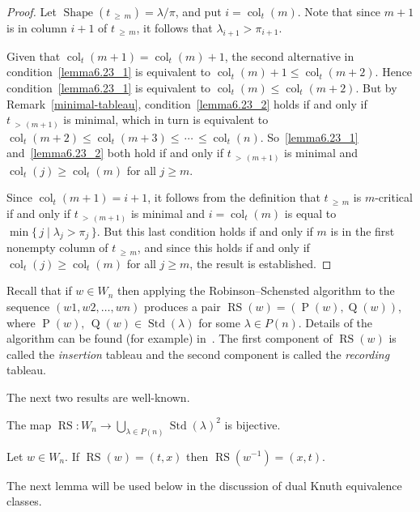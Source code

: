 \documentclass[ALCO,ThmDefs,Unicode,epreuves]{cedram}
\DeclareMathOperator{\col}{col}
\newcommand{\morethan}[2]{#1\,{_{>\,#2}}}
\newcommand{\Morethan}[2]{#1\,{_{\geqslant\,#2}}}
\DeclareMathOperator{\STD}{Std}
\DeclareMathOperator{\shape}{Shape}
\DeclareMathOperator{\RS}{RS}
\DeclareMathOperator{\RSP}{P}
\DeclareMathOperator{\RSQ}{Q}
\begin{document}
\begin{proof}
Let $\shape(\Morethan tm)=\lambda/\pi$, and put $i=\col_t(m)$. Note
that since $m+1$ is in column $i+1$ of $\Morethan tm$, it
follows that $\lambda_{i+1}>\pi_{i+1}$.

Given that $\col_t(m+1)=\col_t(m)+1$, the second alternative in condition~\ref{lemma6.23_1} is
equivalent to $\col_t(m)+1\leqslant\col_t(m+2)$. Hence condition~\ref{lemma6.23_1} is
equivalent to $\col_t(m)\leqslant\col_t(m+2)$. But by Remark~\ref{minimal-tableau},
condition~\ref{lemma6.23_2} holds if and only if $\morethan{t}{(m+1)}$ is minimal, which
in turn is equivalent to
$\col_t(m+2)\leqslant\col_t(m+3)\leqslant \, \cdots \, \leqslant \col_t(n)$.
So~\ref{lemma6.23_1} and~\ref{lemma6.23_2} both hold if and only if $\morethan{t}{(m+1)}$ is minimal
and $\col_t(j)\geqslant \col_t(m)$ for all $j\geqslant m$.

Since $\col_t(m+1)=i+1$, it follows from the definition that
$\Morethan tm$ is $m$-critical if and only if $\morethan{t}{(m+1)}$
is minimal and $i=\col_t(m)$ is equal to $\min\{\,j\mid \lambda_j>\pi_j\,\}$.
But this last condition holds if and only if $m$ is in the first nonempty
column of $\Morethan tm$, and since this holds if and only if
$\col_t(j)\geqslant \col_t(m)$ for all $j\geqslant m$, the result is
established.
\end{proof}

Recall that if $w\in W_{n}$ then applying the Robinson--Schensted algorithm
to the sequence $(w1,w2,\ldots,wn)$ produces a pair $\RS(w) = (\RSP(w),\RSQ(w))$,
where $\RSP(w),\,\RSQ(w)\in \STD(\lambda)$ for some $\lambda\in P(n)$. Details
of the algorithm can be found (for example) in~\cite[Section~3.1]{sag:sym}.
The first component of $\RS(w)$ is called the \emph{insertion}
tableau and the second component is called the \emph{recording} tableau.

The next two results are well-known.

\begin{theo}\label{rs}
The map $\RS\colon W_n\to\bigcup_{\lambda\in P(n)}\STD(\lambda)^2$ is
bijective.
\end{theo}

\begin{theo}\label{rswinv}
Let $w\in W_n$. If $\RS(w) = (t,x)$ then $\RS(w^{-1}) = (x,t)$.
\end{theo}
The next lemma will be used below in the discussion of dual Knuth
equivalence classes.
\end{document}
